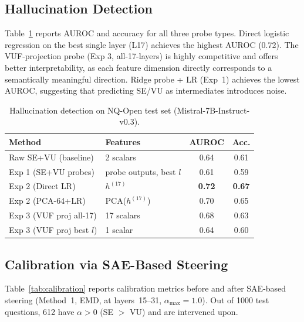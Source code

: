 \documentclass{article}
\begin{document}
\subsection{Hallucination Detection}

Table~\ref{tab:detection} reports AUROC and accuracy for all three probe types.
Direct logistic regression on the best single layer (L17) achieves the highest
AUROC (0.72).  The VUF-projection probe (Exp 3, all-17-layers) is highly
competitive and offers better interpretability, as each feature dimension
directly corresponds to a semantically meaningful direction.  Ridge probe + LR
(Exp~1) achieves the lowest AUROC, suggesting that predicting SE/VU as
intermediates introduces noise.

\begin{table}[h]
\centering
\caption{Hallucination detection on NQ-Open test set (Mistral-7B-Instruct-v0.3).}
\label{tab:detection}
\small
\begin{tabular}{llcc}
\toprule
Method & Features & AUROC & Acc. \\
\midrule
Raw SE+VU (baseline)      & 2 scalars              & 0.64 & 0.61 \\
Exp 1 (SE+VU probes)      & probe outputs, best $l$ & 0.61 & 0.59 \\
Exp 2 (Direct LR)         & $h^{(17)}$              & \textbf{0.72} & \textbf{0.67} \\
Exp 2 (PCA-64+LR)         & PCA($h^{(17)}$)         & 0.70 & 0.65 \\
Exp 3 (VUF proj all-17)   & 17 scalars              & 0.68 & 0.63 \\
Exp 3 (VUF proj best $l$) & 1 scalar                & 0.64 & 0.60 \\
\bottomrule
\end{tabular}
\end{table}

\subsection{Calibration via SAE-Based Steering}

Table~\ref{tab:calibration} reports calibration metrics before and after
SAE-based steering (Method~1, EMD, at layers~15--31, $\alpha_{\max} = 1.0$).
Out of 1000 test questions, 612 have $\alpha > 0$ (SE $>$ VU) and are
intervened upon.
\end{document}
